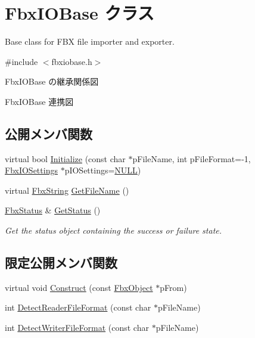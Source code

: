 \hypertarget{class_fbx_i_o_base}{}\section{Fbx\+I\+O\+Base クラス}
\label{class_fbx_i_o_base}


Base class for F\+BX file importer and exporter.  




{\ttfamily \#include $<$fbxiobase.\+h$>$}



Fbx\+I\+O\+Base の継承関係図


Fbx\+I\+O\+Base 連携図
\subsection*{公開メンバ関数}
\begin{DoxyCompactItemize}
\item 
virtual bool \hyperlink{class_fbx_i_o_base_a01d70175d09a1e791e2ce38a9ae3c265}{Initialize} (const char $\ast$p\+File\+Name, int p\+File\+Format=-\/1, \hyperlink{class_fbx_i_o_settings}{Fbx\+I\+O\+Settings} $\ast$p\+I\+O\+Settings=\hyperlink{fbxarch_8h_a070d2ce7b6bb7e5c05602aa8c308d0c4}{N\+U\+LL})
\item 
virtual \hyperlink{class_fbx_string}{Fbx\+String} \hyperlink{class_fbx_i_o_base_ace2742dc782d87dc5bb08bceacb451b7}{Get\+File\+Name} ()
\item 
\hyperlink{class_fbx_status}{Fbx\+Status} \& \hyperlink{class_fbx_i_o_base_a078e47a99b119278ca3ee639e2da5b6d}{Get\+Status} ()
\begin{DoxyCompactList}\small\item\em Get the status object containing the success or failure state. \end{DoxyCompactList}\end{DoxyCompactItemize}
\subsection*{限定公開メンバ関数}
\begin{DoxyCompactItemize}
\item 
virtual void \hyperlink{class_fbx_i_o_base_aed70ed1326f8fb1cc96e2086c73722f8}{Construct} (const \hyperlink{class_fbx_object}{Fbx\+Object} $\ast$p\+From)
\item 
int \hyperlink{class_fbx_i_o_base_aeeed7fece0297ede49ba8ceda58b2743}{Detect\+Reader\+File\+Format} (const char $\ast$p\+File\+Name)
\item 
int \hyperlink{class_fbx_i_o_base_ab33025566a08451ec2cffedfc1130ad4}{Detect\+Writer\+File\+Format} (const char $\ast$p\+File\+Name)
\end{DoxyCompactItemize}
